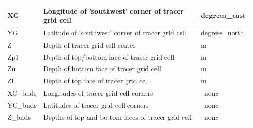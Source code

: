 \begin{longtable}{|m{}|m{}|m{}|}
XG &Longitude of 'southwest' corner of tracer grid cell &degrees\_east  \\ \hline
YG &Latitude of 'southwest' corner of tracer grid cell &degrees\_north  \\ \hline
Z &Depth of tracer grid cell center &m  \\ \hline
Zp1 &Depth of top/bottom face of tracer grid cell &m  \\ \hline
Zu &Depth of bottom face of tracer grid cell &m  \\ \hline
Zl &Depth of top face of tracer grid cell &m  \\ \hline
XC\_bnds &Longitudes of tracer grid cell corners &--none--  \\ \hline
YC\_bnds &Latitudes of tracer grid cell corners &--none--  \\ \hline
Z\_bnds &Depths of top and bottom faces of tracer grid cell &--none--  \\ \hline
\end{longtable}

\newp
\pagebreak
